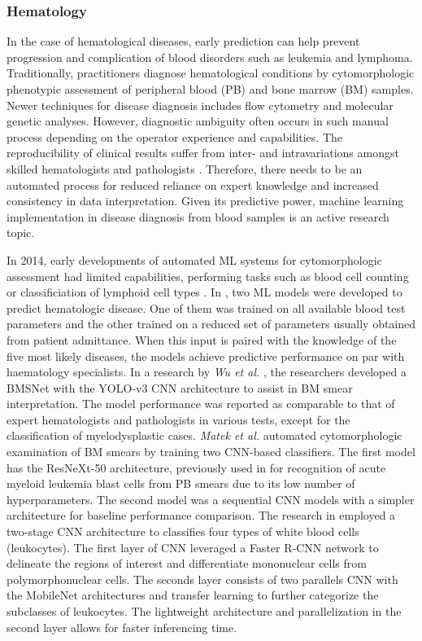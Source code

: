 \documentclass{article}
\begin{document}
\subsubsection{Hematology}
In the case of hematological diseases, early prediction can help prevent progression and complication of blood disorders such as leukemia and lymphoma. 
Traditionally, practitioners diagnose hematological conditions by cytomorphologic phenotypic assessment of peripheral blood (PB) and bone marrow (BM) samples.
Newer techniques for disease diagnosis includes flow cytometry and molecular genetic analyses. 
However, diagnostic ambiguity often occurs in such manual process depending on the operator experience and capabilities. 
The reproducibility of clinical results suffer from inter- and intravariations amongst skilled hematologists and pathologists \cite{walter_artificial_2023,wu_hematologist-level_2020}.
Therefore, there needs to be an automated process for reduced reliance on expert knowledge and increased consistency in data interpretation.
Given its predictive power, machine learning implementation in disease diagnosis from blood samples is an active research topic.

In 2014, early developments of automated ML systems for cytomorphologic assessment had limited capabilities, performing tasks such as blood cell counting or classificiation of lymphoid cell types \cite{alomari_automatic_2014,alferez_automatic_2014,alferez_automatic_2015}.
In \cite{guncar_application_2018}, two ML models were developed to predict hematologic disease.
One of them was trained on all available blood test parameters and the other trained on a reduced set of parameters usually obtained from patient admittance.
When this input is paired with the knowledge of the five most likely diseases, the models achieve predictive performance on par with haematology specialists.
In a research by \textit{Wu et al.} \cite{wu_hematologist-level_2020}, the researchers developed a BMSNet with the YOLO-v3 CNN architecture to assist in BM smear interpretation.
The model performance was reported as comparable to that of expert hematologists and pathologists in various tests, except for the classification of myelodysplastic cases.
\textit{Matek et al.} \cite{matek_highly_2021} automated cytomorphologic examination of BM smears by training two CNN-based classifiers. 
The first model has the ResNeXt-50 architecture, previously used in \cite{matek_human-level_2019} for recognition of acute myeloid leukemia blast cells from PB smears due to its low number of hyperparameters.
The second model was a sequential CNN models with a simpler architecture for baseline performance comparison.
The research in \cite{cheuque_efficient_2022} employed a two-stage CNN architecture to classifies four types of white blood cells (leukocytes).
The first layer of CNN leveraged a Faster R-CNN network to delineate the regions of interest and differentiate mononuclear cells from polymorphonuclear cells. 
The seconds layer consists of two parallels CNN with the MobileNet architectures and transfer learning to further categorize the subclasses of leukocytes. 
The lightweight architecture and parallelization in the second layer allows for faster inferencing time.
\end{document}
